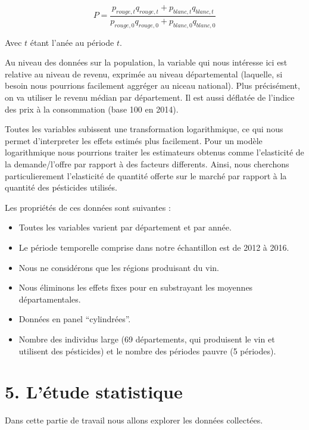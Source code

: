 \documentclass[11pt,]{article}
\providecommand{\tightlist}{%
  \setlength{\itemsep}{0pt}\setlength{\parskip}{0pt}}
\begin{document}
\begin{equation*}
  P = \frac{p_{rouge, t} q_{rouge, t} + p_{blanc, t} q_{blanc, t}}{p_{rouge, 0} q_{rouge, 0} + p_{blanc, 0} q_{blanc, 0}}
\end{equation*}

Avec \(t\) étant l'anée au période \(t\).

Au niveau des données sur la population, la variable qui nous intéresse
ici est relative au niveau de revenu, exprimée au niveau départemental
(laquelle, si besoin nous pourrions facilement aggréger au niceau
national). Plus précisément, on va utiliser le revenu médian par
département. Il est aussi déflatée de l'indice des prix à la
consommation (base 100 en 2014).

Toutes les variables subissent une transformation logarithmique, ce qui
nous permet d'interpreter les effets estimés plus facilement. Pour un
modèle logarithmique nous pourrions traiter les estimateurs obtenus
comme l'elasticité de la demande/l'offre par rapport à des facteurs
differents. Ainsi, nous cherchons particulierement l'elasticité de
quantité offerte sur le marché par rapport à la quantité des pésticides
utilisés.

Les propriétés de ces données sont suivantes :

\begin{itemize}
\tightlist
\item
  Toutes les variables varient par département et par année.
\item
  Le période temporelle comprise dans notre échantillon est de 2012 à
  2016.
\item
  Nous ne considérons que les régions produisant du vin.
\item
  Nous éliminons les effets fixes pour en substrayant les moyennes
  départamentales.
\item
  Données en panel ``cylindrées''.
\item
  Nombre des individus large (69 départements, qui produisent le vin et
  utilisent des pésticides) et le nombre des périodes pauvre (5
  périodes).
\end{itemize}

\hypertarget{letude-statistique}{%
\section{5. L'étude statistique}\label{letude-statistique}}

Dans cette partie de travail nous allons explorer les données
collectées.
\end{document}
